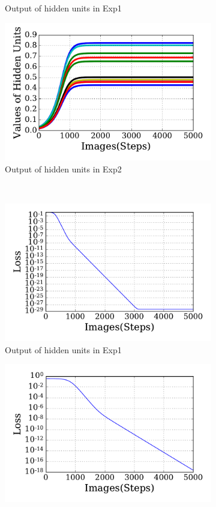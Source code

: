 \begin{figure}
\begin{subfigure}[t]{0.48\textwidth}
		\caption{Output of hidden units in Exp1}
	\end{subfigure}
	\begin{subfigure}[t]{0.48\textwidth}
		\includegraphics[width=\textwidth]{pics_sdlm/20_exp_AE/exp2_hid_non.pdf}
		\caption{Output of hidden units in Exp2}
	\end{subfigure}\\
	\begin{subfigure}[t]{0.48\textwidth}
		\includegraphics[width=\textwidth]{pics_sdlm/20_exp_AE/exp1_loss.pdf}
		\caption{Output of hidden units in Exp1}
	\end{subfigure}
	\begin{subfigure}[t]{0.48\textwidth}
		\includegraphics[width=\textwidth]{pics_sdlm/20_exp_AE/exp2_loss.pdf}

\end{subfigure}
\end{figure}
